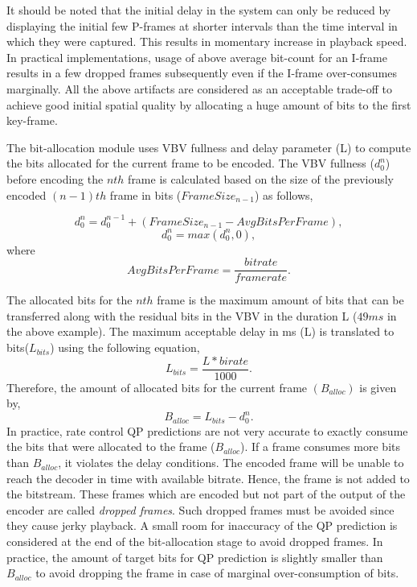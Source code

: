 \documentclass[11pt]{article} %
\begin{document}
It should be noted that the initial delay in the system can only be reduced by displaying the initial few P-frames at shorter intervals than the time interval in which they were captured. This results in momentary increase in playback speed. In practical implementations, usage of above average bit-count for an I-frame results in a few dropped frames subsequently even if the I-frame over-consumes marginally. All the above artifacts are considered as an acceptable trade-off to achieve good initial spatial quality by allocating a huge amount of bits to the first key-frame.

The bit-allocation module uses VBV fullness and delay parameter (L) to compute the bits allocated for the current frame to be encoded. The VBV fullness ($d_0^{n}$) before encoding the $nth$ frame  is calculated based on the size of the previously encoded $(n-1)th$ frame in bits ($FrameSize_{n-1}$) as follows,

\begin{equation}
\label{Eq:Frame level bit error accumulation}
d_0^{n} = d_0^{n-1} + (FrameSize_{n-1} - AvgBitsPerFrame),
\end{equation}
$$ d_0^{n} = max(d_0^{n} , 0), $$
where $$ AvgBitsPerFrame = \frac{bitrate}{framerate}.$$

The allocated bits for the $nth$ frame is the maximum amount of bits that can be transferred along with the residual bits in the VBV in the duration L ($49ms$ in the above example). The maximum acceptable delay in ms (L) is translated to bits($L_{bits}$) using the following equation,
$$ L_{bits} = \frac{L * birate}{1000}.$$
Therefore, the amount of allocated bits for the current frame $(B_{alloc})$ is given by,
\begin{equation}
	\label{Eq:bit-allocation}
	B_{alloc} = L_{bits} - d_0^n .
\end{equation}
In practice, rate control QP predictions are not very accurate to exactly consume the bits that were allocated to the frame ($B_{alloc}$). If a frame consumes more bits than $B_{alloc}$, it violates the delay conditions. The encoded frame will be unable to reach the decoder in time with available bitrate. Hence, the frame is not added to the bitstream. These frames which are encoded but not part of the output of the encoder are called \textit{dropped frames}. Such dropped frames must be avoided since they cause jerky playback. A small room for inaccuracy of the QP prediction is considered at the end of the bit-allocation stage to avoid dropped frames. In practice, the amount of target bits for QP prediction is slightly smaller than $B_{alloc}$ to avoid dropping the frame in case of marginal over-consumption of bits.
\end{document}
